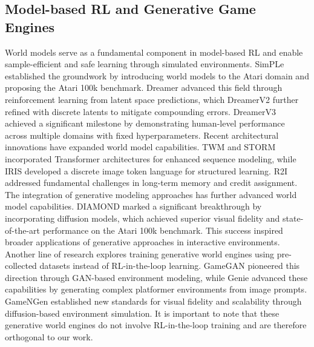 \subsection{Model-based RL and Generative Game Engines}
\vspace{-0.7em}
World models serve as a fundamental component in model-based RL and enable sample-efficient and safe learning through simulated environments. SimPLe \cite{Kaiser2020SimPLe} established the groundwork by introducing world models to the Atari domain and proposing the Atari 100k benchmark. Dreamer \cite{Hafner2020Dreamer} advanced this field through reinforcement learning from latent space predictions, which DreamerV2 \cite{hafner2021DreamerV2} further refined with discrete latents to mitigate compounding errors. DreamerV3 \cite{hafner2024DreamerV3} achieved a significant milestone by demonstrating human-level performance across multiple domains with fixed hyperparameters. Recent architectural innovations have expanded world model capabilities. TWM \cite{robine2023TWM} and STORM \cite{zhang2023storm} incorporated Transformer architectures for enhanced sequence modeling, while IRIS \cite{micheli2023iris} developed a discrete image token language for structured learning. R2I \cite{samsami2024r2i} addressed fundamental challenges in long-term memory and credit assignment. 
The integration of generative modeling approaches has further advanced world model capabilities. DIAMOND \cite{alonso2024diamond} marked a significant breakthrough by incorporating diffusion models, which achieved superior visual fidelity and state-of-the-art performance on the Atari 100k benchmark. This success inspired broader applications of generative approaches in interactive environments.
Another line of research explores training generative world engines using pre-collected datasets instead of RL-in-the-loop learning. GameGAN \cite{kim2020GameGAN} pioneered this direction through GAN-based environment modeling, while Genie \cite{bruce2024genie} advanced these capabilities by generating complex platformer environments from image prompts. GameNGen \cite{valevski2024diffusionmodelsrealtimegame} established new standards for visual fidelity and scalability through diffusion-based environment simulation. It is important to note that these generative world engines do not involve RL-in-the-loop training and are therefore orthogonal to our work.
\vspace{-0.7em}

